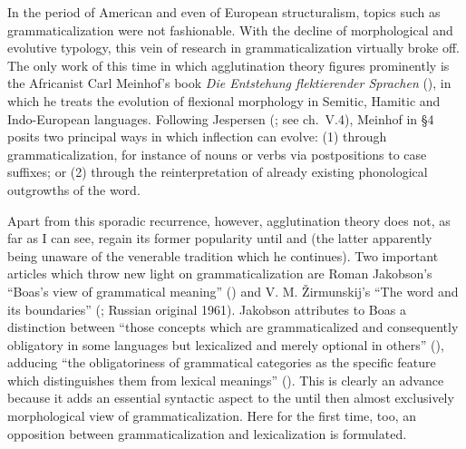 In the period of American and even of European structuralism, topics such as grammaticalization were not fashionable. With the decline of morphological and evolutive typology, this vein of research in grammaticalization virtually broke off. The only work of this time in which agglutination theory figures prominently is the Africanist Carl Meinhof's book \textit{Die Entstehung flektierender Sprachen} (\citeyear{Meinhof1936}), in which he treats the evolution of flexional morphology in Semitic, Hamitic and Indo-European languages. Following Jespersen (\citeyear[375--388]{Jespersen1922}; see ch.~V.4), Meinhof in §4 posits two principal ways in which inflection can evolve: (1) through grammaticalization, for instance of nouns or verbs via postpositions to case suffixes; or (2) through the reinterpretation of already existing phonological outgrowths of the word.

\label{quote:Jakobson}Apart from this sporadic recurrence, however, agglutination theory does not, as far as I can see, regain its former popularity until \citet{Hodge1970} and \citet{Givón1971} (the latter apparently being unaware of the venerable tradition which he continues). Two important articles which throw new light on grammaticalization are Roman Jakobson's “Boas's view of grammatical meaning” (\citeyear{Jakobson1959}) and V. M. Žirmunskij's “The word and its boundaries” (\citeyear{Žirmunskij1966}; Russian original 1961). Jakobson attributes to Boas a distinction between “those concepts which are grammaticalized and consequently obligatory in some languages but lexicalized and merely optional in others” (\citeyear[492]{Jakobson1959}), adducing “the obligatoriness of grammatical categories as the specific feature which distinguishes them from lexical meanings” (\citeyear[489]{Jakobson1959}). This is clearly an advance because it adds an essential syntactic aspect to the until then almost exclusively morphological view of grammaticalization. Here for the first time, too, an opposition between grammaticalization and lexicalization is formulated.


